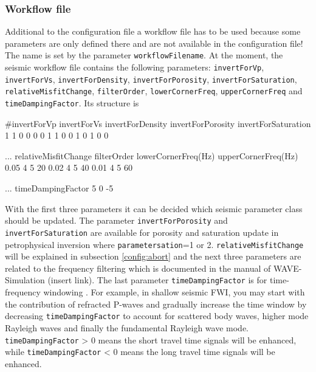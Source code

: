 \documentclass[pdftex,a4paper,parskip,listof=totoc,bibliography=totoc,onehalfspacing,12pt]{scrreprt}
\begin{document}
\subsubsection{Workflow file}
Additional to the configuration file a workflow file has to be used because some parameters are only defined there and are not available in the configuration file! The name is set by the parameter \verb+workflowFilename+. At the moment, the seismic workflow file contains the following parameters: \verb+invertForVp+, \verb+invertForVs+, \verb+invertForDensity+, \verb+invertForPorosity+, \verb+invertForSaturation+, \verb+relativeMisfitChange+, \verb+filterOrder+, \verb+lowerCornerFreq+, \verb+upperCornerFreq+ and \verb+timeDampingFactor+. Its structure is 
\begin{verbnobox}[\fontsize{11pt}{11pt}\selectfont]
#invertForVp invertForVs invertForDensity invertForPorosity invertForSaturation
      1           1            0                0                 0
      0           1            1                0                 0
      1           0            1                0                 0
\end{verbnobox}
\begin{verbnobox}[\fontsize{11pt}{11pt}\selectfont]
... relativeMisfitChange filterOrder lowerCornerFreq(Hz) upperCornerFreq(Hz)
             0.05            4             5                   20
             0.02            4             5                   40
             0.01            4             5                   60
\end{verbnobox}
\begin{verbnobox}[\fontsize{11pt}{11pt}\selectfont]
... timeDampingFactor
         5  
         0
        -5
\end{verbnobox}
With the first three parameters it can be decided which seismic parameter class should be updated. The parameter \verb+invertForPorosity+ and \verb+invertForSaturation+ are available for porosity and saturation update in petrophysical inversion where \verb+parametersation+=1 or 2. \verb+relativeMisfitChange+ will be explained in subsection \ref{config:abort} and the next three parameters are related to the frequency filtering which is documented in the manual of WAVE-Simulation (insert link). The last parameter \verb+timeDampingFactor+ is for time-frequency windowing \citep{athanasopoulos2020time}. For example, in shallow seismic FWI, you may start with the contribution of refracted P-waves and gradually increase the time window by decreasing \verb+timeDampingFactor+ to account for scattered body waves, higher mode Rayleigh waves and finally the fundamental Rayleigh wave mode. \verb+timeDampingFactor+ > 0 means the short travel time signals will be enhanced, while \verb+timeDampingFactor+ < 0 means the long travel time signals will be enhanced.
\end{document}
